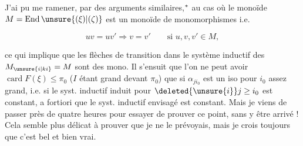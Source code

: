 

J'ai pu me ramener, par des arguments similaires,$\vphantom{x}^{\ast}$ au cas où le monoïde $M=\operatorname{End}\unsure{(\xi)|(\zeta)}$ est un monoïde de monomorphismes i.e.

\[
uv=uv'\Longrightarrow v=v'\qquad\text{si }u,v,v'\in M,
\]

ce  qui implique que les flèches de transition dans le système inductif des $M_{\unsure{i|ki}}=M$ sont des mono. Il s'ensuit que l'on ne peut avoir $\operatorname{card}F(\xi)\leq\pi_0$ ($I$ étant grand devant $\pi_0$) que si $\alpha_{j i_0}$ est un iso pour  $i_0$ assez grand, i.e. si le syst. inductif  induit  pour $\deleted{\unsure{i}}j\geq i_0$ est constant, a fortiori que le syst. inductif envisagé est  constant. Mais je viens de passer près de quatre heures pour essayer de prouver ce point, sans y être arrivé ! Cela semble plus délicat à prouver que je ne le prévoyais, mais je crois toujours que c'est bel et bien vrai.

\margin{$\unsure{\xi|\rbrace}$}
